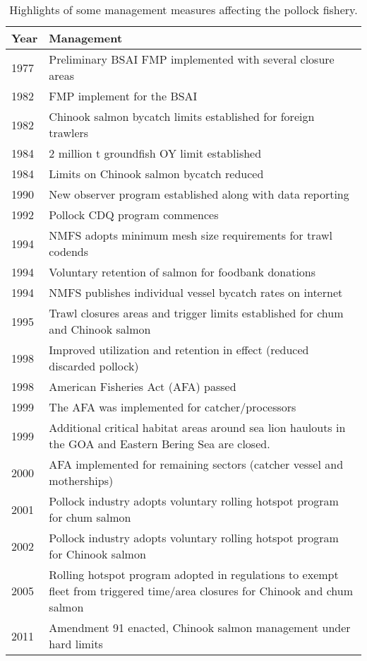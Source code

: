 \documentclass[]{article}
\begin{document}
\begin{table}[ht]
\centering
\caption{ Highlights of some management measures affecting the pollock fishery.       }
\label{tab:mgt}
\begin{tabular}{p{0.5in}p{5.5in}}
\hline
Year    &   Management  \\
\hline
1977    &   Preliminary BSAI FMP implemented with several closure areas \\
1982    &   FMP implement for the BSAI  \\
1982    &   Chinook salmon bycatch limits established for foreign trawlers  \\
1984    &   2 million t groundfish OY limit established \\
1984    &   Limits on Chinook salmon bycatch reduced    \\
1990    &   New observer program established along with data reporting  \\
1992    &   Pollock CDQ program commences   \\
1994    &   NMFS adopts minimum mesh size requirements for trawl codends    \\
1994    &   Voluntary retention of salmon for foodbank donations    \\
1994    &   NMFS publishes individual vessel bycatch rates on internet  \\
1995    &   Trawl closures areas and trigger limits established for chum and Chinook salmon \\
1998    &   Improved utilization and retention in effect (reduced discarded pollock)    \\
1998    &   American Fisheries Act (AFA) passed \\
1999    &   The AFA was implemented for catcher/processors  \\
1999    &   Additional critical habitat areas around sea lion haulouts in the GOA and Eastern Bering Sea are closed.    \\
2000    &   AFA implemented for remaining sectors (catcher vessel and motherships)  \\
2001    &   Pollock industry adopts voluntary rolling hotspot program for chum salmon   \\
2002    &   Pollock industry adopts voluntary rolling hotspot program for Chinook salmon    \\
2005    &   Rolling hotspot program adopted in regulations to exempt fleet from triggered time/area closures for Chinook and chum salmon    \\
2011    &   Amendment 91 enacted, Chinook salmon management under hard limits   \\

\end{tabular}
\end{table}
\end{document}
